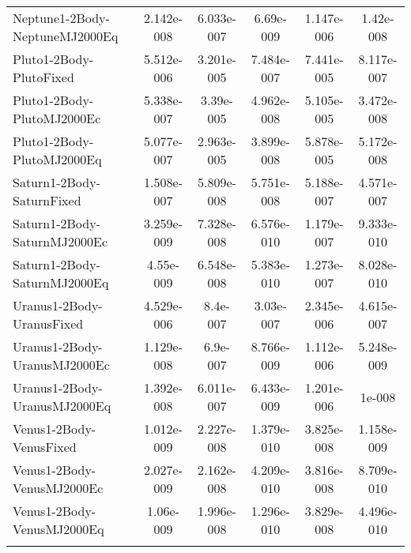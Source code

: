\begin{table}[htbp!]
\begin{tabular}{lccccc}
         Neptune1-2Body-NeptuneMJ2000Eq & 2.142e-008 & 6.033e-007 & 6.69e-009 & 1.147e-006 & 1.42e-008 \\
         Pluto1-2Body-PlutoFixed & 5.512e-006 & 3.201e-005 & 7.484e-007 & 7.441e-005 & 8.117e-007 \\
         Pluto1-2Body-PlutoMJ2000Ec & 5.338e-007 & 3.39e-005 & 4.962e-008 & 5.105e-005 & 3.472e-008 \\
         Pluto1-2Body-PlutoMJ2000Eq & 5.077e-007 & 2.963e-005 & 3.899e-008 & 5.878e-005 & 5.172e-008 \\
         Saturn1-2Body-SaturnFixed & 1.508e-007 & 5.809e-008 & 5.751e-008 & 5.188e-007 & 4.571e-007 \\
         Saturn1-2Body-SaturnMJ2000Ec & 3.259e-009 & 7.328e-008 & 6.576e-010 & 1.179e-007 & 9.333e-010 \\
         Saturn1-2Body-SaturnMJ2000Eq & 4.55e-009 & 6.548e-008 & 5.383e-010 & 1.273e-007 & 8.028e-010 \\
         Uranus1-2Body-UranusFixed & 4.529e-006 & 8.4e-007 & 3.03e-007 & 2.345e-006 & 4.615e-007 \\
         Uranus1-2Body-UranusMJ2000Ec & 1.129e-008 & 6.9e-007 & 8.766e-009 & 1.112e-006 & 5.248e-009 \\
         Uranus1-2Body-UranusMJ2000Eq & 1.392e-008 & 6.011e-007 & 6.433e-009 & 1.201e-006 & 1e-008 \\
         Venus1-2Body-VenusFixed & 1.012e-009 & 2.227e-008 & 1.379e-010 & 3.825e-008 & 1.158e-009 \\
         Venus1-2Body-VenusMJ2000Ec & 2.027e-009 & 2.162e-008 & 4.209e-010 & 3.816e-008 & 8.709e-010 \\
         Venus1-2Body-VenusMJ2000Eq & 1.06e-009 & 1.996e-008 & 1.296e-010 & 3.829e-008 & 4.496e-010 \\
      \hline\hline
      \label{Table: WinGMAT-STK CS Parameters Set 5} 
\end{tabular}
\end{table}
